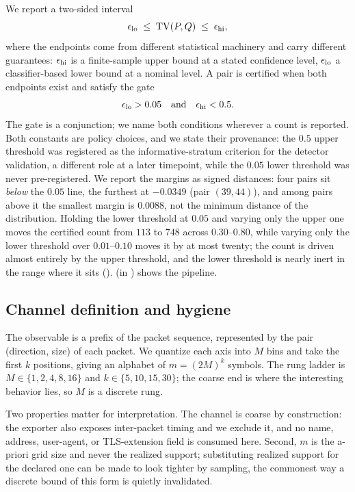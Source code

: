 We report a two-sided interval
\begin{equation}
  \epsilon_{\mathrm{lo}} \;\le\; \mathrm{TV}(P,Q) \;\le\; \epsilon_{\mathrm{hi}} ,
  \label{eq:bracket}
\end{equation}
where the endpoints come from different statistical machinery and carry different
guarantees: $\epsilon_{\mathrm{hi}}$ is a finite-sample upper bound at a stated confidence level,
$\epsilon_{\mathrm{lo}}$ a classifier-based lower bound at a nominal level. A pair is certified
when both endpoints exist and satisfy the gate
\begin{equation}
  \epsilon_{\mathrm{lo}} > 0.05 \quad\text{and}\quad \epsilon_{\mathrm{hi}} < 0.5 .
  \label{eq:gate}
\end{equation}
The gate is a conjunction; we name both conditions wherever a count is
reported. Both constants are policy choices, and we state their provenance: the
$0.5$ upper threshold was registered as the informative-stratum criterion for the
detector validation, a different role at a later timepoint, while the $0.05$ lower
threshold was never pre-registered. We report the margins as signed
distances: four pairs sit \emph{below} the $0.05$ line, the furthest at $-0.0349$
(pair $(39,44)$), and among pairs above it the smallest margin is $0.0088$, not
the minimum distance of the distribution. Holding the lower threshold at $0.05$
and varying only the upper one moves the certified count from $113$ to $748$
across $0.30$--$0.80$, while varying only the lower threshold over
$0.01$--$0.10$ moves it by at most twenty; the count is driven almost entirely by
the upper threshold, and the lower threshold is nearly inert in the range where
it sits ().
 (in ) shows the pipeline.

\subsection{Channel definition and hygiene}
\label{sec:design/channel}

The observable is a prefix of the packet sequence, represented by the pair
(direction, size) of each packet. We quantize each axis into $M$ bins and take
the first $k$ positions, giving an alphabet of $m = (2M)^k$ symbols. The rung
ladder is $M \in \{1,2,4,8,16\}$ and $k \in \{5,10,15,30\}$; the coarse end is
where the interesting behavior lies, so $M$ is a discrete rung.

Two properties matter for interpretation. The channel is coarse by construction:
the exporter also exposes inter-packet timing and we exclude it, and no name,
address, user-agent, or TLS-extension field is consumed here. Second, $m$ is the
a-priori grid size and never the realized support; substituting realized support
for the declared one can be made to look tighter by sampling, the commonest way a
discrete bound of this form is quietly invalidated.

